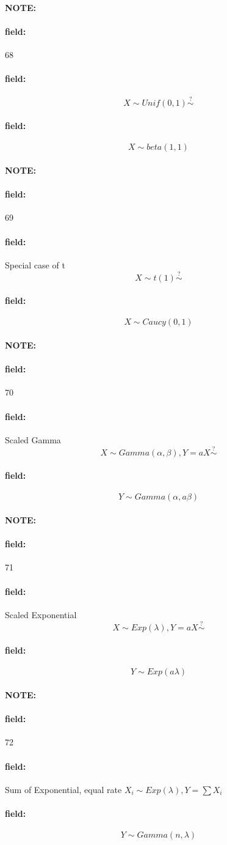 \documentclass[12pt]{article}
\newenvironment{note}{\paragraph{NOTE:}}{}
\newenvironment{field}{\paragraph{field:}}{}
\begin{document}
\begin{note} \begin{field} \tiny 68 \end{field}
  \begin{field}
    $$ X \sim Unif(0,1) \overset{?}{\sim}$$
  \end{field}
  \begin{field}
    $$ X \sim beta(1,1)$$
  \end{field}
\end{note}

\begin{note} \begin{field} \tiny 69 \end{field}
  \begin{field}
    Special case of t
    $$ X \sim t(1) \overset{?}{\sim}$$
  \end{field}
  \begin{field}
    $$ X \sim Caucy(0,1)$$
  \end{field}
\end{note}


\begin{note} \begin{field} \tiny 70 \end{field}
  \begin{field}
    Scaled Gamma
    $$X \sim Gamma(\alpha,\beta), Y = aX \overset{?}{\sim}$$
  \end{field}
  \begin{field}
    $$ Y \sim Gamma(\alpha,a\beta)$$
  \end{field}
\end{note}

\begin{note} \begin{field} \tiny 71 \end{field}
  \begin{field}
    Scaled Exponential
    $$ X \sim Exp(\lambda), Y = aX \overset{?}{\sim}$$
  \end{field}
  \begin{field}
    $$ Y \sim Exp(a\lambda)$$
  \end{field}
\end{note}

\begin{note} \begin{field} \tiny 72 \end{field}
  \begin{field}
    Sum of Exponential, equal rate
    $X_i \sim Exp(\lambda), Y = \sum X_i$
  \end{field}
  \begin{field}
    $$Y \sim Gamma(n,\lambda)$$
  \end{field}
\end{note}
\end{document}
